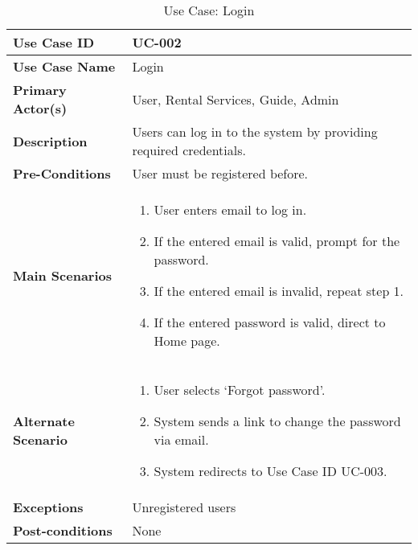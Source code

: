 \begin{table}[!ht]
    \centering
    \begin{tabular}{|l|p{}|}
        \hline
        \textbf{Use Case ID} & UC-002 \\
        \hline
        \textbf{Use Case Name} & Login \\
        \hline
        \textbf{Primary Actor(s)} & User, Rental Services, Guide, Admin \\
        \hline
        \textbf{Description} & Users can log in to the system by providing required credentials. \\
        \hline
        \textbf{Pre-Conditions} & User must be registered before. \\
        \hline
        \textbf{Main Scenarios} & 
        \begin{enumerate}[label=\arabic*.,itemsep=0pt]
            \item User enters email to log in.
            \item If the entered email is valid, prompt for the password.
            \item If the entered email is invalid, repeat step 1.
            \item If the entered password is valid, direct to Home page.
        \end{enumerate} \\
        \hline
        \textbf{Alternate Scenario} & 
        \begin{enumerate}[label=\arabic*.,itemsep=0pt]
            \item User selects ‘Forgot password’.
            \item System sends a link to change the password via email.
            \item System redirects to Use Case ID UC-003.
        \end{enumerate} \\
        \hline
        \textbf{Exceptions} & Unregistered users \\
        \hline
        \textbf{Post-conditions} & None \\
        \hline
    \end{tabular}
    \label{tab:use-case-login}
    \caption{Use Case: Login}
\end{table}

